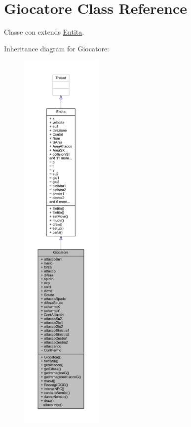 \hypertarget{class_entita_1_1_giocatore}{}\section{Giocatore Class Reference}
\label{class_entita_1_1_giocatore}


Classe con extends \hyperlink{class_entita_1_1_entita}{Entita}.  




Inheritance diagram for Giocatore\+:
\nopagebreak
\begin{figure}[H]
\begin{center}
\leavevmode
\includegraphics[height=550pt]{class_entita_1_1_giocatore__inherit__graph}
\end{center}
\end{figure}


